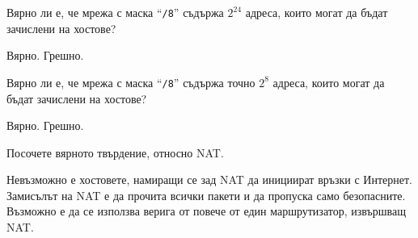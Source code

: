 \begin{questions}
  \question[6] Вярно ли е, че мрежа с маска "`\texttt{/8}"' съдържа
  $2^{24}$ адреса, които могат да бъдат зачислени на хостове?
  \begin{oneparchoices}
    \choice Вярно.
    \CorrectChoice Грешно.
  \end{oneparchoices}


  \question[6] Вярно ли е, че мрежа с маска "`\texttt{/8}"' съдържа точно
  $2^8$ адреса, които могат да бъдат зачислени на хостове?
  \begin{oneparchoices}
    \choice Вярно.
    \CorrectChoice Грешно.
  \end{oneparchoices}

  \question[7] Посочете вярното твърдение, относно NAT.
  \begin{choices}
    \choice Невъзможно е хостовете, намиращи се зад NAT да инициират връзки с Интернет.
    \choice Замисълът на NAT е да прочита всички пакети и да пропуска само безопасните.
    \CorrectChoice Възможно е да се използва верига от повече от един
    маршрутизатор, извършващ NAT.
  \end{choices}
\end{questions}

